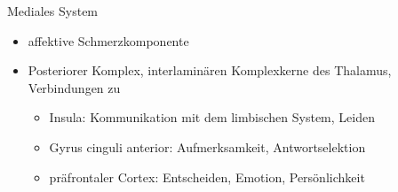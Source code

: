 \documentclass{beamer}
\begin{document}
\begin{frame}{Mediales System}
    
\begin{itemize}
\item
affektive Schmerzkomponente
\item
Posteriorer Komplex, interlaminären Komplexkerne des Thalamus, Verbindungen zu 
\begin{itemize}
    \item 
    Insula: Kommunikation mit dem limbischen System, Leiden
    \item
Gyrus cinguli anterior: Aufmerksamkeit, Antwortselektion
\item
präfrontaler Cortex: Entscheiden, Emotion, Persönlichkeit
\end{itemize}


\end{itemize}
    

    
\end{frame}



\end{document}
